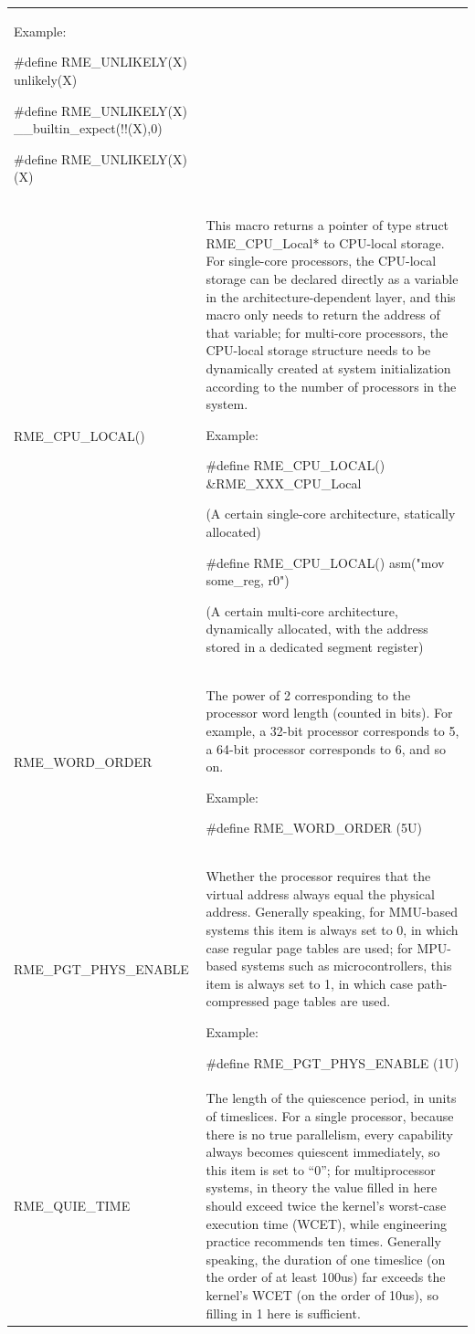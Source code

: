 \begin{xltabular}{\textwidth}{@{}>{\hsize\raggedright\arraybackslash}X>{\hsize\raggedright\arraybackslash}X@{}}
Example:

\#define RME\_UNLIKELY(X) unlikely(X)

\#define RME\_UNLIKELY(X) \_\_builtin\_expect(!!(X),0)

\#define RME\_UNLIKELY(X) (X)\strut
\tabularnewline
RME\_CPU\_LOCAL()\strut
 & This macro returns a pointer of type struct RME\_CPU\_Local* to CPU-local storage. For single-core processors, the CPU-local storage can be declared directly as a variable in the architecture-dependent layer, and this macro only needs to return the address of that variable; for multi-core processors, the CPU-local storage structure needs to be dynamically created at system initialization according to the number of processors in the system.

Example:

\#define RME\_CPU\_LOCAL() \&RME\_XXX\_CPU\_Local

(A certain single-core architecture, statically allocated)

\#define RME\_CPU\_LOCAL() asm("mov some\_reg, r0")

(A certain multi-core architecture, dynamically allocated, with the address stored in a dedicated segment register)\strut
\tabularnewline
RME\_WORD\_ORDER\strut
 & The power of 2 corresponding to the processor word length (counted in bits). For example, a 32-bit processor corresponds to 5, a 64-bit processor corresponds to 6, and so on.

Example:

\#define RME\_WORD\_ORDER (5U)\strut
\tabularnewline
RME\_PGT\_PHYS\_ENABLE\strut
 & Whether the processor requires that the virtual address always equal the physical address. Generally speaking, for MMU-based systems this item is always set to 0, in which case regular page tables are used; for MPU-based systems such as microcontrollers, this item is always set to 1, in which case path-compressed page tables are used.

Example:

\#define RME\_PGT\_PHYS\_ENABLE (1U)\strut
\tabularnewline
RME\_QUIE\_TIME\strut
 & The length of the quiescence period, in units of timeslices. For a single processor, because there is no true parallelism, every capability always becomes quiescent immediately, so this item is set to ``0''; for multiprocessor systems, in theory the value filled in here should exceed twice the kernel's worst-case execution time (WCET), while engineering practice recommends ten times. Generally speaking, the duration of one timeslice (on the order of at least 100us) far exceeds the kernel's WCET (on the order of 10us), so filling in 1 here is sufficient.


\end{xltabular}
